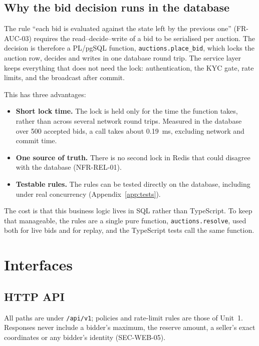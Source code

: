 \documentclass[11pt,a4paper]{article}
\begin{document}
\subsection{Why the bid decision runs in the database}
\label{sec:why-db}
The rule ``each bid is evaluated against the state left by the previous one'' (FR-AUC-03) requires the read--decide--write of a bid to be serialised per auction. The decision is therefore a PL/pgSQL function, \texttt{auctions.place\_bid}, which locks the auction row, decides and writes in one database round trip. The service layer keeps everything that does not need the lock: authentication, the KYC gate, rate limits, and the broadcast after commit.

This has three advantages:
\begin{itemize}[nosep]
  \item \textbf{Short lock time.} The lock is held only for the time the function takes, rather than across several network round trips. Measured in the database over 500 accepted bids, a call takes about 0.19~ms, excluding network and commit time.
  \item \textbf{One source of truth.} There is no second lock in Redis that could disagree with the database (NFR-REL-01).
  \item \textbf{Testable rules.} The rules can be tested directly on the database, including under real concurrency (Appendix~\ref{app:tests}).
\end{itemize}
The cost is that this business logic lives in SQL rather than TypeScript. To keep that manageable, the rules are a single pure function, \texttt{auctions.resolve}, used both for live bids and for replay, and the TypeScript tests call the same function.
\section{Interfaces}

\subsection{HTTP API}
\label{sec:api}
All paths are under \texttt{/api/v1}; policies and rate-limit rules are those of Unit~1. Responses never include a bidder's maximum, the reserve amount, a seller's exact coordinates or any bidder's identity (SEC-WEB-05).
\end{document}
